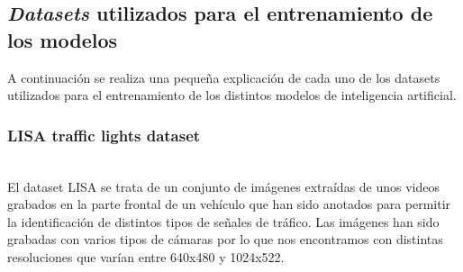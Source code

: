 \clearpage
\subsection{\textit{Datasets} utilizados para el entrenamiento de los modelos} \label{datasets}
A continuación se realiza una pequeña explicación de cada uno de los datasets utilizados para el entrenamiento de los distintos modelos de inteligencia artificial. 

\subsubsection{LISA traffic lights dataset}\mbox{}\\
El dataset LISA \cite{lisaPaper} se trata de un conjunto de imágenes extraídas de unos videos grabados en la parte frontal de un vehículo que han sido anotados para permitir la identificación de distintos tipos de señales de tráfico. Las imágenes han sido grabadas con varios tipos de cámaras por lo que nos encontramos con distintas resoluciones que varían entre 640x480 y 1024x522.


